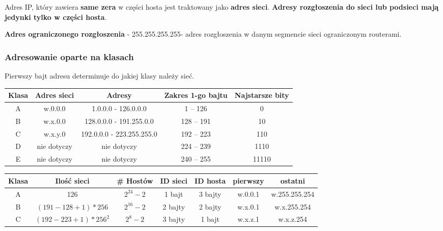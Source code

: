 \documentclass[12pt]{article}
\begin{document}
    Adres IP, który zawiera \textbf{same zera} w części hosta jest traktowany jako \textbf{adres sieci}.
    \textbf{Adresy rozgłoszenia do sieci lub podsieci mają jedynki tylko w części hosta}.

    \textbf{Adres ograniczonego rozgłoszenia} - 255.255.255.255- adres rozgłoszenia
    w danym segmencie sieci ograniczonym routerami.\\

    \subsubsection{Adresowanie oparte na klasach}

    Pierwszy bajt adresu determinuje do jakiej klasy należy sieć.

    \begin{tabular}{|c|c|c|c|c|}
        \hline
        Klasa & Adres sieci & Adresy & Zakres 1-go bajtu & Najstarsze bity\\
        \hline
        A & w.0.0.0 & 1.0.0.0 - 126.0.0.0 & 1 – 126 & 0\\
        \hline
        B & w.x.0.0 & 128.0.0.0 - 191.255.0.0 & 128 – 191 & 10\\
        \hline
        C & w.x.y.0 & 192.0.0.0 - 223.255.255.0 & 192 – 223 & 110\\
        \hline
        D & nie dotyczy & nie dotyczy & 224 – 239 & 1110\\
        \hline
        E & nie dotyczy & nie dotyczy & 240 – 255 & 11110\\
        \hline
    \end{tabular}

    \begin{table}[H]
        \begin{center}
            \begin{tabular}{|c|c|c|c|c|c|c|}
                \hline
                Klasa & Ilość sieci & \# Hostów & ID sieci & ID hosta & pierwszy & ostatni\\
                \hline
                A & 126 & $2^{24}-2$ & 1 bajt & 3 bajty & w.0.0.1 & w.255.255.254\\
                \hline
                B & $(191-128+1)*256$ & $2^{16}-2$ & 2 bajty & 2 bajty & w.x.0.1 & w.x.255.254\\
                \hline
                C & $(192-223+1)*256^2$ & $2^8-2$ & 3 bajty & 1 bajt & w.x.z.1 & w.x.z.254\\
                \hline
            \end{tabular}
        \end{center}
    \end{table}
\end{document}
